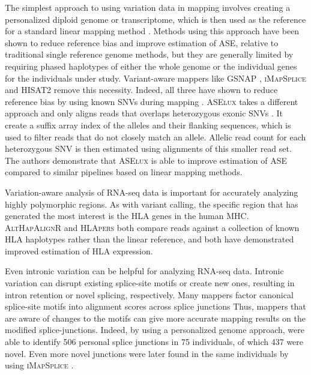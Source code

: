 The simplest approach to using variation data in mapping involves creating a personalized diploid genome or transcriptome, which is then used as the reference for a standard linear mapping method \cite{Rozowsky_2011,Raghupathy2018-sd}.
Methods using this approach have been shown to reduce reference bias and improve estimation of ASE, relative to traditional single reference genome methods, but they are generally limited by requiring phased haplotypes of either the whole genome or the individual genes for the individuals under study.
Variant-aware mappers like \textsc{GSNAP} \cite{Wu2010-hv}, \textsc{iMapSplice} \cite{Liu_2018} and \textsc{HISAT2} \cite{Kim_2019} remove this necessity.
Indeed, all three have shown to reduce reference bias by using known SNVs during mapping \cite{Castel2015-ef,Liu_2018}.
\textsc{ASElux} takes a different approach and only aligns reads that overlaps heterozygous exonic SNVs \cite{Miao2018-ps}.
It create a suffix array index of the alleles and their flanking sequences, which is used to filter reads that do not closely match an allele.
Allelic read count for each heterozygous SNV is then estimated using alignments of this smaller read set.
The authors demonstrate that \textsc{ASElux} is able to improve estimation of ASE compared to similar pipelines based on linear mapping methods.

Variation-aware analysis of RNA-seq data is important for accurately analyzing highly polymorphic regions.
As with variant calling, the specific region that has generated the most interest is the HLA genes in the human MHC. 
\textsc{AltHapAlignR} \cite{Lee_2018} and \textsc{HLApers} \cite{Aguiar2019-fy} both compare reads against a collection of known HLA haplotypes rather than the linear reference, and both have demonstrated improved estimation of HLA expression.

Even intronic variation can be helpful for analyzing RNA-seq data. 
Intronic variation can disrupt existing splice-site motifs or create new ones, resulting in intron retention or novel splicing, respectively. 
Many mappers factor canonical splice-site motifs into alignment scores across splice junctions
Thus, mappers that are aware of changes to the motifs can give more accurate mapping results on the modified splice-junctions. 
Indeed, by using a personalized genome approach, \citeauthor{Stein_2015} \cite{Stein_2015} were able to identify 506 personal splice junctions in 75 individuals, of which 437 were novel.
Even more novel junctions were later found in the same individuals by \citeauthor{Liu_2018} using \textsc{iMapSplice} \cite{Liu_2018}.

